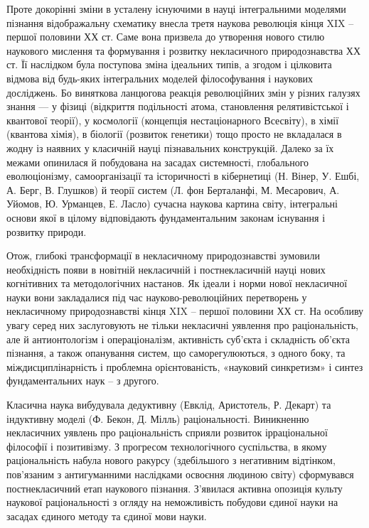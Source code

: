 Проте докорінні зміни в усталену існуючими в науці інтегральними
моделями пізнання відображальну схематику внесла третя наукова революція
кінця XIX – першої половини ХХ ст. Саме вона призвела до утворення нового
стилю наукового мислення та формування і розвитку некласичного
природознавства ХХ ст. Її наслідком була поступова зміна ідеальних типів, а
згодом і цілковита відмова від будь-яких інтегральних моделей філософування і
наукових досліджень. Бо виняткова ланцюгова реакція революційних змін у
різних галузях знання --- у фізиці (відкриття подільності атома, становлення
релятивістської і квантової теорії), у космології (концепція нестаціонарного
Всесвіту), в хімії (квантова хімія), в біології (розвиток генетики) тощо просто
не вкладалася в жодну із наявних у класичній науці пізнавальних конструкцій.
Далеко за їх межами опинилася й побудована на засадах системності,
глобального еволюціонізму, самоорганізації та історичності в кібернетиці (Н.
Вінер, У. Ешбі, А. Берг, В. Глушков) й теорії систем (Л. фон Берталанфі, М.
Месарович, А. Уйомов, Ю. Урманцев, Е. Ласло) сучасна наукова картина світу,
інтегральні основи якої в цілому відповідають фундаментальним законам
існування і розвитку природи.

Отож, глибокі трансформації в некласичному природознавстві зумовили
необхідність появи в новітній некласичній і постнекласичній науці нових
когнітивних та методологічних настанов. Як ідеали і норми нової некласичної
науки вони закладалися під час науково-революційних перетворень у
некласичному природознавстві кінця XIX – першої половини ХХ ст. На
особливу увагу серед них заслуговують не тільки некласичні уявлення про
раціональність, але й антионтологізм і операціоналізм, активність суб’єкта і
складність об’єкта пізнання, а також опанування систем, що саморегулюються,
з одного боку, та міждисциплінарність і проблемна орієнтованість, «науковий
синкретизм» і синтез фундаментальних наук – з другого.

Класична наука вибудувала дедуктивну (Евклід, Аристотель, Р. Декарт) та
індуктивну моделі (Ф. Бекон, Д. Мілль) раціональності. Виникненню
некласичних уявлень про раціональність сприяли розвиток ірраціональної
філософії і позитивізму. З прогресом технологічного суспільства, в якому
раціональність набула нового ракурсу (здебільшого з негативним відтінком, 
пов’язаним з антигуманними наслідками освоєння людиною світу)
сформувався постнекласичний етап наукового пізнання. З’явилася активна
опозиція культу наукової раціональності з огляду на неможливість побудови
єдиної науки на засадах єдиного методу та єдиної мови науки.

